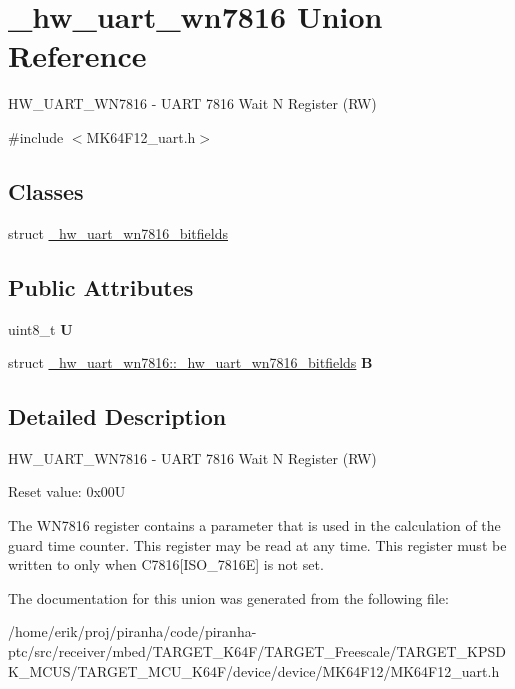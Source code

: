 \hypertarget{union__hw__uart__wn7816}{}\section{\+\_\+hw\+\_\+uart\+\_\+wn7816 Union Reference}
\label{union__hw__uart__wn7816}


H\+W\+\_\+\+U\+A\+R\+T\+\_\+\+W\+N7816 -\/ U\+A\+RT 7816 Wait N Register (RW)  




{\ttfamily \#include $<$M\+K64\+F12\+\_\+uart.\+h$>$}

\subsection*{Classes}
\begin{DoxyCompactItemize}
\item 
struct \hyperlink{struct__hw__uart__wn7816_1_1__hw__uart__wn7816__bitfields}{\+\_\+hw\+\_\+uart\+\_\+wn7816\+\_\+bitfields}
\end{DoxyCompactItemize}
\subsection*{Public Attributes}
\begin{DoxyCompactItemize}
\item 
uint8\+\_\+t {\bfseries U}\hypertarget{union__hw__uart__wn7816_a85e37833df36af716b44e121089fb3bb}{}\label{union__hw__uart__wn7816_a85e37833df36af716b44e121089fb3bb}

\item 
struct \hyperlink{struct__hw__uart__wn7816_1_1__hw__uart__wn7816__bitfields}{\+\_\+hw\+\_\+uart\+\_\+wn7816\+::\+\_\+hw\+\_\+uart\+\_\+wn7816\+\_\+bitfields} {\bfseries B}\hypertarget{union__hw__uart__wn7816_a392c88bd3b780dbfcf5ab731aa29349f}{}\label{union__hw__uart__wn7816_a392c88bd3b780dbfcf5ab731aa29349f}

\end{DoxyCompactItemize}


\subsection{Detailed Description}
H\+W\+\_\+\+U\+A\+R\+T\+\_\+\+W\+N7816 -\/ U\+A\+RT 7816 Wait N Register (RW) 

Reset value\+: 0x00U

The W\+N7816 register contains a parameter that is used in the calculation of the guard time counter. This register may be read at any time. This register must be written to only when C7816\mbox{[}I\+S\+O\+\_\+7816E\mbox{]} is not set. 

The documentation for this union was generated from the following file\+:\begin{DoxyCompactItemize}
\item 
/home/erik/proj/piranha/code/piranha-\/ptc/src/receiver/mbed/\+T\+A\+R\+G\+E\+T\+\_\+\+K64\+F/\+T\+A\+R\+G\+E\+T\+\_\+\+Freescale/\+T\+A\+R\+G\+E\+T\+\_\+\+K\+P\+S\+D\+K\+\_\+\+M\+C\+U\+S/\+T\+A\+R\+G\+E\+T\+\_\+\+M\+C\+U\+\_\+\+K64\+F/device/device/\+M\+K64\+F12/M\+K64\+F12\+\_\+uart.\+h\end{DoxyCompactItemize}
